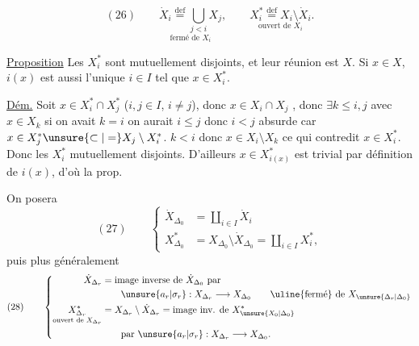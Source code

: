 \[
(26)\qquad
\underset{\text{fermé de }X_i}{\dot X_i\overset{\mathrm{def}}=\bigcup_{j<i}X_j},
\qquad
\underset{\text{ouvert de }X_i}{X_i^*\overset{\mathrm{def}}=X_i\setminus\dot X_i}.
\]


\uline{Proposition} Les $X_i^*$ sont mutuellement disjoints, et leur réunion est $X$. Si $x\in X$, $i(x)$ est aussi l'unique $i\in I$ tel que $x\in X_i^*$.

\uline{Dém.} Soit $x\in X_i^*\cap X_j^*$ ($i,j\in I$, $i\ne j$), donc  $x\in X_i\cap X_j$ , donc $\exists k\leq i,j$ avec
$x\in X_k$ si on avait $k=i$ on aurait $i\leq j$ donc $i<j$ absurde car $x\in X_j^*\unsure{\subset|=}X_j\setminus X_i^*$.
 $k<i$ donc $x\in X_i\setminus X_k$ ce qui contredit $x\in X_i^*$. Donc les $X_i^*$ mutuellement disjoints. D'ailleurs $x\in X_{i(x)}^*$ est trivial par définition de $i(x)$, d'où la prop.

On posera
\[
(27)\qquad
\left\{\begin{aligned}
\dot X_{\Delta_0}&=\coprod_{i\in I}\dot X_i\\
X_{\Delta_0}^*&=X_{\Delta_0}\setminus\dot X_{\Delta_0}=\coprod_{i\in I}X_i^*,
\end{aligned}\right.
\]
puis  plus généralement
\[
(28)\qquad
\left\{\begin{aligned}
\dot X_{\Delta_r}&=\text{image inverse de }\dot X_{\Delta_0}\text{ par}\\
&\qquad\unsure{a_r|\sigma_r}:X_{\Delta_r}\longrightarrow X_{\Delta_0}
\qquad\text{\uline{fermé} de }X_{\unsure{\Delta_r|\Delta_0}}\\
\underset{\text{ouvert de }X_{\Delta_r}}{X_{\Delta_r}^*}&=X_{\Delta_r}\setminus\dot X_{\Delta_r}=\text{image inv. de }X_{\unsure{X_0|\Delta_0}}^*\\
&\qquad\text{par }\unsure{a_r|\sigma_r}:X_{\Delta_r}\longrightarrow X_{\Delta_0}.
\end{aligned}\right.
\]
